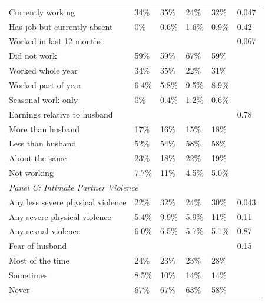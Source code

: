\documentclass{article}        %
\begin{document}
\begin{landscape}
\begin{longtable}{@{}p{6cm}p{2.5cm}p{2.5cm}p{2.5cm}p{2.5cm}p{1.5cm}@{}}
\quad Currently working                      & 34\%   & 35\%   & 24\%   & 32\%   & 0.047 \\
\quad Has job but currently absent           & 0\%    & 0.6\%  & 1.6\%  & 0.9\%  & 0.42  \\
\quad Worked in last 12 months               &        &        &        &        & 0.067 \\
\quad\quad Did not work                      & 59\%   & 59\%   & 67\%   & 59\%   &       \\
\quad\quad Worked whole year                 & 34\%   & 35\%   & 22\%   & 31\%   &       \\
\quad\quad Worked part of year               & 6.4\%  & 5.8\%  & 9.5\%  & 8.9\%  &       \\
\quad\quad Seasonal work only                & 0\%    & 0.4\%  & 1.2\%  & 0.6\%  &       \\
\quad Earnings relative to husband           &        &        &        &        & 0.78  \\
\quad\quad More than husband                 & 17\%   & 16\%   & 15\%   & 18\%   &       \\
\quad\quad Less than husband                 & 52\%   & 54\%   & 58\%   & 58\%   &       \\
\quad\quad About the same                    & 23\%   & 18\%   & 22\%   & 19\%   &       \\
\quad\quad Not working                       & 7.7\%  & 11\%   & 4.5\%  & 5.0\%  &       \\[6pt]

\multicolumn{6}{l}{\textit{Panel C: Intimate Partner Violence}} \\[2pt]

\quad Any less severe physical violence      & 22\%   & 32\%   & 24\%   & 30\%   & 0.043 \\
\quad Any severe physical violence           & 5.4\%  & 9.9\%  & 5.9\%  & 11\%   & 0.11  \\
\quad Any sexual violence                    & 6.0\%  & 6.5\%  & 5.7\%  & 5.1\%  & 0.87  \\
\quad Fear of husband                        &        &        &        &        & 0.15  \\
\quad\quad Most of the time                  & 24\%   & 23\%   & 23\%   & 28\%   &       \\
\quad\quad Sometimes                         & 8.5\%  & 10\%   & 14\%   & 14\%   &       \\
\quad\quad Never                             & 67\%   & 67\%   & 63\%   & 58\%   &       \\[6pt]


\end{longtable}
\end{landscape}
\end{document}
